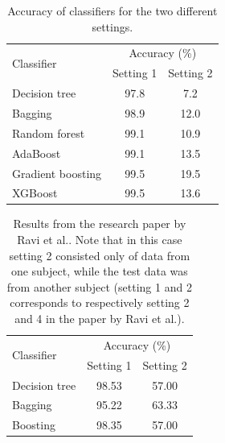 \begin{table}[]
\caption{Accuracy of classifiers for the two different settings.}
\begin{tabular}{|l|c|c|}
\hline
\multirow{2}{*}{Classifier} & \multicolumn{2}{c|}{Accuracy (\%)} \\ \cline{2-3} 
                            & Setting 1           & Setting  2          \\ \hline
Decision tree               & 97.8             & 7.2             \\ \hline
Bagging                     & 98.9             & 12.0            \\ \hline
Random forest               & 99.1             & 10.9            \\ \hline
AdaBoost                    & 99.1             & 13.5            \\ \hline
Gradient boosting           & 99.5             & 19.5            \\ \hline
XGBoost                     & 99.5             & 13.6             \\ \hline
\end{tabular}
\label{tab:accuracy}
\end{table}


\begin{table}[]
    \centering
    \caption{Results from the research paper by Ravi et al.\cite{ravi}. Note that in this case setting 2 consisted only of data from one subject, while the test data was from another subject (setting 1 and 2 corresponds to respectively setting 2 and 4 in the paper by Ravi et al.).}
    \begin{tabular}{|l|c|c|}
\hline
\multirow{2}{*}{Classifier} & \multicolumn{2}{c|}{Accuracy (\%)} \\ \cline{2-3} 
                            & Setting 1         & Setting  2        \\ \hline
Decision tree               & 98.53             & 57.00             \\ \hline
Bagging                     & 95.22             & 63.33            \\ \hline
Boosting                    & 98.35             & 57.00     \\ 
\hline
\end{tabular}
    \label{tab:ravi_results}
\end{table}


